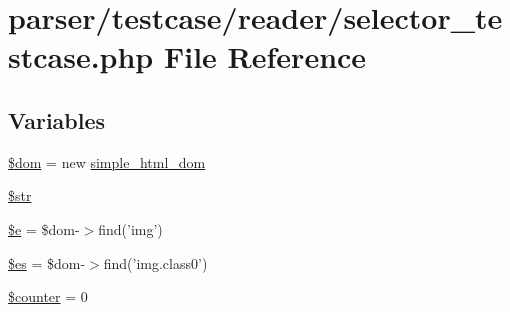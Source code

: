 \hypertarget{reader_2selector__testcase_8php}{\section{parser/testcase/reader/selector\+\_\+testcase.php File Reference}
\label{reader_2selector__testcase_8php}
}
\subsection*{Variables}
\begin{DoxyCompactItemize}
\item 
\hyperlink{reader_2selector__testcase_8php_a46127a794280dd592812c25b62af34b0}{\$dom} = new \hyperlink{classsimple__html__dom}{simple\+\_\+html\+\_\+dom}
\item 
\hyperlink{reader_2selector__testcase_8php_a7542d95618011800c61773127fa625cf}{\$str}
\item 
\hyperlink{reader_2selector__testcase_8php_ab74076a9b7e1d23d12b9e8d65e60315a}{\$e} = \$dom-\/$>$find('img')
\item 
\hyperlink{reader_2selector__testcase_8php_a388cbda27103d2baee3997798d1f2744}{\$es} = \$dom-\/$>$find('img.\+class0')
\item 
\hyperlink{reader_2selector__testcase_8php_adc0a189fac719187ba2e6f01ca0f2466}{\$counter} = 0
\end{DoxyCompactItemize}


